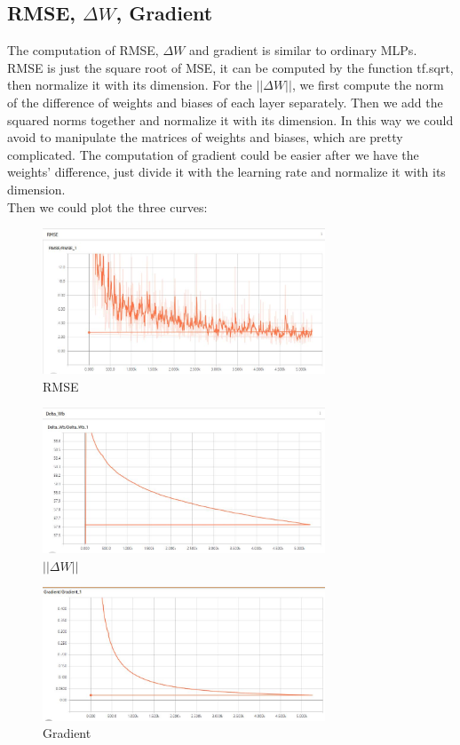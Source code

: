 \documentclass{article}
\begin{document}
\subsection{RMSE, $\Delta W$, Gradient}
The computation of RMSE, $\Delta W$ and gradient is similar to ordinary MLPs. RMSE is just the square root of MSE, it can be computed by the function tf.sqrt, then normalize it with its dimension. For the $||\Delta W||$, we first compute the norm of the difference of weights and biases of each layer separately. Then we add the squared norms together and normalize it with its dimension. In this way we could avoid to manipulate the matrices of weights and biases, which are pretty complicated. The computation of gradient could be easier after we have the weights' difference, just divide it with the learning rate and normalize it with its dimension.\\
Then we could plot the three curves:
  \begin{figure}[H]
  \centering
  \includegraphics[width=0.75\textwidth]{RMSE.jpg}
  \caption{RMSE}\label{}
  \end{figure}
  \begin{figure}[H]
  \centering
  \includegraphics[width=0.75\textwidth]{DeltaWb.jpg}
  \caption{$||\Delta W||$}\label{}
  \end{figure}
  \begin{figure}[H]
  \centering
  \includegraphics[width=0.75\textwidth]{Gradient.jpg}
  \caption{Gradient}\label{}
  \end{figure}
\end{document}
